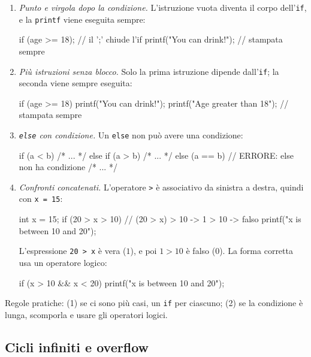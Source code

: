 \documentclass[11pt,a4paper]{article}
\begin{document}
\begin{enumerate}
    \item \emph{Punto e virgola dopo la condizione.} L'istruzione vuota diventa il corpo dell'\lstinline|if|, e la \lstinline|printf| viene eseguita sempre:
\begin{codice}
if (age >= 18);                       // il ';' chiude l'if
    printf("You can drink!\n");       // stampata sempre
\end{codice}
    \item \emph{Più istruzioni senza blocco.} Solo la prima istruzione dipende dall'\lstinline|if|; la seconda viene sempre eseguita:
\begin{codice}
if (age >= 18)
    printf("You can drink!\n");
    printf("Age greater than 18\n");  // stampata sempre
\end{codice}
    \item \emph{\lstinline|else| con condizione.} Un \lstinline|else| non può avere una condizione:
\begin{codice}
if (a < b)
    { /* ... */ }
else if (a > b)
    { /* ... */ }
else (a == b)                         // ERRORE: else non ha condizione
    { /* ... */ }
\end{codice}
    \item \emph{Confronti concatenati.} L'operatore \lstinline|>| è associativo da sinistra a destra, quindi con \lstinline|x = 15|:
\begin{codice}
int x = 15;
if (20 > x > 10)                      // (20 > x) > 10  ->  1 > 10  ->  falso
    printf("x is between 10 and 20");
\end{codice}
    L'espressione \lstinline|20 > x| è vera ($1$), e poi $1 > 10$ è falso ($0$). La forma corretta usa un operatore logico:
\begin{codice}
if (x > 10 && x < 20)
    printf("x is between 10 and 20");
\end{codice}
\end{enumerate}
Regole pratiche: (1) se ci sono più casi, un \lstinline|if| per ciascuno; (2) se la condizione è lunga, scomporla e usare gli operatori logici.

\subsection{Cicli infiniti e overflow}
\end{document}
